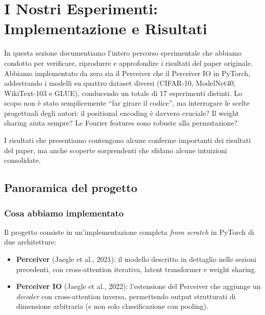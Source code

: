 \documentclass[12pt,a4paper]{article}
\begin{document}
\newpage
\section{I Nostri Esperimenti: Implementazione e Risultati} \label{sec:nostri_esperimenti}

In questa sezione documentiamo l'intero percorso sperimentale che abbiamo condotto per verificare, riprodurre e approfondire i risultati del paper originale. Abbiamo implementato da zero sia il Perceiver che il Perceiver IO in PyTorch, addestrando i modelli su quattro dataset diversi (CIFAR-10, ModelNet40, WikiText-103 e GLUE), conducendo un totale di 17 esperimenti distinti. Lo scopo non \`e stato semplicemente ``far girare il codice'', ma interrogare le scelte progettuali degli autori: il positional encoding \`e davvero cruciale? Il weight sharing aiuta sempre? Le Fourier features sono robuste alla permutazione?

I risultati che presentiamo contengono alcune conferme importanti dei risultati del paper, ma anche scoperte sorprendenti che sfidano alcune intuizioni consolidate.

\subsection{Panoramica del progetto} \label{sec:panoramica_progetto}

\subsubsection{Cosa abbiamo implementato}

Il progetto consiste in un'implementazione completa \emph{from scratch} in PyTorch di due architetture:
\begin{itemize}[leftmargin=*]
    \item \textbf{Perceiver} (Jaegle et al., 2021): il modello descritto in dettaglio nelle sezioni precedenti, con cross-attention iterativa, latent transformer e weight sharing.
    \item \textbf{Perceiver IO} (Jaegle et al., 2022): l'estensione del Perceiver che aggiunge un \emph{decoder} con cross-attention inversa, permettendo output strutturati di dimensione arbitraria (e non solo classificazione con pooling).
\end{itemize}
\end{document}
